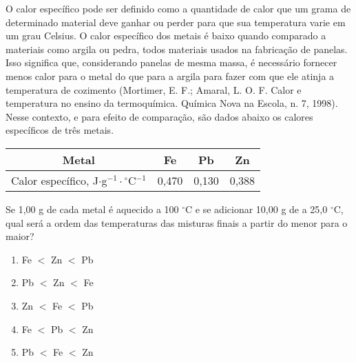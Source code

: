 O calor específico pode ser definido como a quantidade de calor que um grama de determinado material deve ganhar ou perder para que sua temperatura varie em um grau Celsius.
O calor específico dos metais é baixo quando comparado a materiais como argila ou pedra, todos materiais usados na fabricação de panelas.
Isso significa que, considerando panelas de mesma massa, é necessário fornecer menos calor para o metal do que para a argila para fazer com que ele atinja a temperatura de cozimento (Mortimer, E. F.; Amaral, L. O. F. Calor e temperatura no ensino da termoquímica. Química Nova na Escola, n. 7, 1998).
Nesse contexto, e para efeito de comparação, são dados abaixo os calores específicos de três metais.

\renewcommand{\arraystretch}{1.5}
\begin{tabular}{|c|c|c|c|}
\hline
Metal & Fe & Pb & Zn \\
\hline
Calor específico, J$\cdot$g$^{-1}\cdot$$^\circ$C$^{-1}$ & 0,470 & 0,130 & 0,388 \\
\hline
\end{tabular}

Se 1,00 g de cada metal é aquecido a 100 $^\circ$C e se adicionar 10,00 g de  a 25,0 $^\circ$C, qual será a ordem das temperaturas das misturas finais a partir do menor para o maior? 

\begin{enumerate}[label = (\alph*)]
	\item Fe $<$ Zn $<$ Pb 
	\item Pb $<$ Zn $<$ Fe 
	\item Zn $<$ Fe $<$ Pb 
	\item Fe $<$ Pb $<$ Zn 
	\item Pb $<$ Fe $<$ Zn
\end{enumerate}
